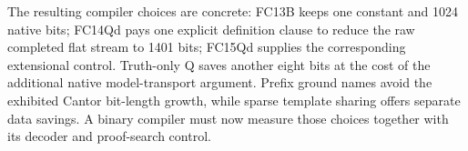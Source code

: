 The resulting compiler choices are concrete: FC13B keeps one constant and
1024 native bits; FC14Qd pays one explicit definition clause to reduce the
raw completed flat stream to 1401 bits; FC15Qd supplies the corresponding
extensional control.  Truth-only Q saves another eight bits at the cost of
the additional native model-transport argument.  Prefix ground names avoid
the exhibited Cantor bit-length growth, while sparse template sharing offers
separate data savings.  A binary compiler must now measure those choices
together with its decoder and proof-search control.
